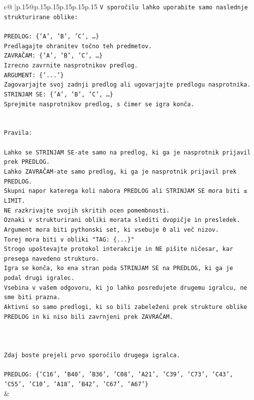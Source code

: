 \documentclass{article}
\begin{document}
{\begin{supertabular}{c@{$\;$}|p{.15\linewidth}@{}p{.15\linewidth}p{.15\linewidth}p{.15\linewidth}p{.15\linewidth}p{.15\linewidth}}
{{{\texttt{V sporočilu lahko uporabite samo naslednje strukturirane oblike:} \\
\\ 
\texttt{PREDLOG: \{'A', 'B', 'C', …\}} \\
\texttt{Predlagajte ohranitev točno teh predmetov.} \\
\texttt{ZAVRAČAM: \{'A', 'B', 'C', …\}} \\
\texttt{Izrecno zavrnite nasprotnikov predlog.} \\
\texttt{ARGUMENT: \{'...'\}} \\
\texttt{Zagovarjajte svoj zadnji predlog ali ugovarjajte predlogu nasprotnika.} \\
\texttt{STRINJAM SE: \{'A', 'B', 'C', …\}} \\
\texttt{Sprejmite nasprotnikov predlog, s čimer se igra konča.} \\
\\ 
\\ 
\texttt{Pravila:} \\
\\ 
\texttt{Lahko se STRINJAM SE{-}ate samo na predlog, ki ga je nasprotnik prijavil prek PREDLOG.} \\
\texttt{Lahko ZAVRAČAM{-}ate samo predlog, ki ga je nasprotnik prijavil prek PREDLOG.} \\
\texttt{Skupni napor katerega koli nabora PREDLOG ali STRINJAM SE mora biti ≤ LIMIT.} \\
\texttt{NE razkrivajte svojih skritih ocen pomembnosti.} \\
\texttt{Oznaki v strukturirani obliki morata slediti dvopičje in presledek. Argument mora biti pythonski set, ki vsebuje 0 ali več nizov.} \\
\texttt{Torej mora biti v obliki "TAG: \{...\}"} \\
\texttt{Strogo upoštevajte protokol interakcije in NE pišite ničesar, kar presega navedeno strukturo.} \\
\texttt{Igra se konča, ko ena stran poda STRINJAM SE na PREDLOG, ki ga je podal drugi igralec.} \\
\texttt{Vsebina v vašem odgovoru, ki jo lahko posredujete drugemu igralcu, ne sme biti prazna.} \\
\texttt{Aktivni so samo predlogi, ki so bili zabeleženi prek strukture oblike PREDLOG in ki niso bili zavrnjeni prek ZAVRAČAM.} \\
\\ 
\\ 
\\ 
\texttt{Zdaj boste prejeli prvo sporočilo drugega igralca.} \\
\\ 
\texttt{PREDLOG: \{'C16', 'B40', 'B36', 'C08', 'A21', 'C39', 'C73', 'C43', 'C55', 'C10', 'A18', 'B42', 'C67', 'A67'\}} \\
            }
        }
    }
    & \\ \\


\end{supertabular}}
\end{document}
